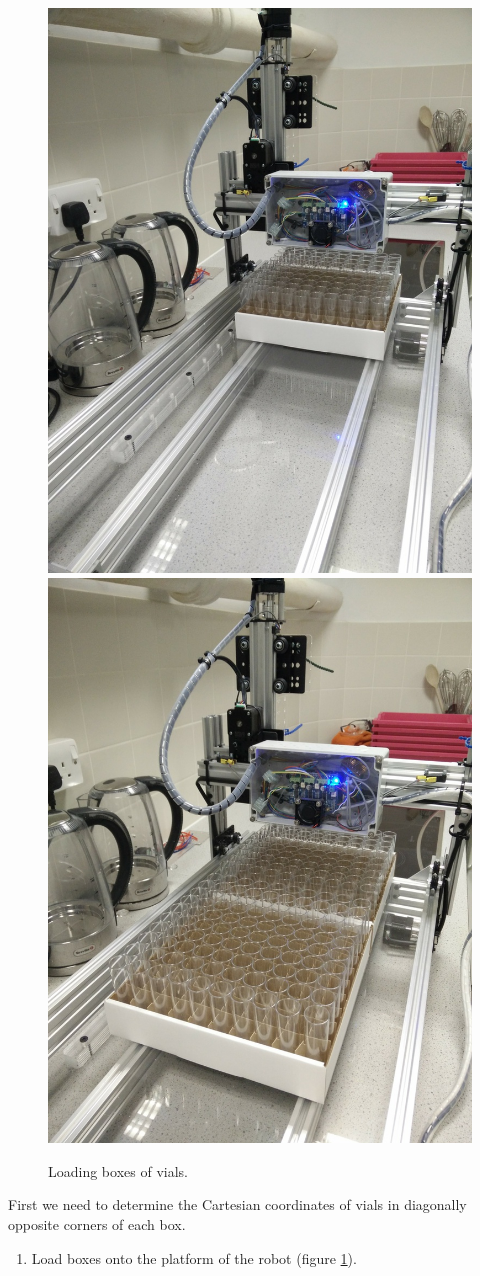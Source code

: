 \documentclass[]{book}
\providecommand{\tightlist}{%
  \setlength{\itemsep}{0pt}\setlength{\parskip}{0pt}}
\theoremstyle{definition}
\theoremstyle{definition}
\theoremstyle{remark}
\begin{document}
\begin{figure}

{\centering \includegraphics[width=0.5\linewidth]{images/one_box_loaded} \includegraphics[width=0.5\linewidth]{images/two_boxes_loaded} 

}

\caption{Loading boxes of vials.}\label{fig:loadBoxes2}
\end{figure}

First we need to determine the Cartesian coordinates of vials in
diagonally opposite corners of each box.

\begin{enumerate}
\def\labelenumi{\arabic{enumi}.}
\tightlist
\item
  Load boxes onto the platform of the robot (figure
  \ref{fig:loadBoxes2}).
\end{enumerate}
\end{document}
